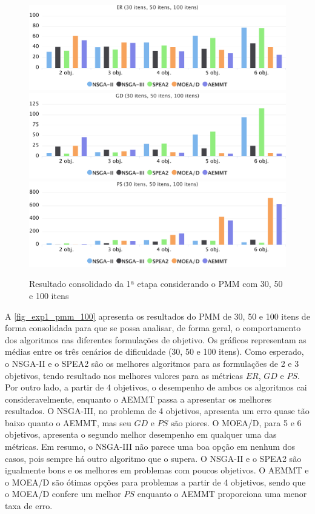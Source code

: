 \begin{figure}[!htbp]
	\includegraphics[width=1\textwidth]{cap_experimentos/figs/etapa1/er-mkp-todos}
	\includegraphics[width=1\textwidth]{cap_experimentos/figs/etapa1/gd-mkp-todos}
	\includegraphics[width=1\textwidth]{cap_experimentos/figs/etapa1/ps-mkp-todos}
	\caption{\label{fig_exp1_pmm_todos}Resultado consolidado da 1ª etapa considerando o PMM com 30, 50 e 100 itens}
\end{figure}

A \autoref{fig_exp1_pmm_100} apresenta os resultados do PMM de 30, 50 e 100 itens de forma consolidada para que se possa analisar, de forma geral, o comportamento dos algoritmos nas diferentes formulações de objetivo. Os gráficos representam as médias entre os três cenários de dificuldade (30, 50 e 100 itens). Como esperado, o NSGA-II e o SPEA2 são os melhores algoritmos para as formulações de 2 e 3 objetivos, tendo resultado nos melhores valores para as métricas $ER$, $GD$ e $PS$. Por outro lado, a partir de 4 objetivos, o desempenho de ambos os algoritmos cai consideravelmente, enquanto o AEMMT passa a apresentar os melhores resultados. O NSGA-III, no problema de 4 objetivos, apresenta um erro quase tão baixo quanto o AEMMT, mas seu $GD$ e $PS$ são piores. O MOEA/D, para 5 e 6 objetivos, apresenta o segundo melhor desempenho em qualquer uma das métricas. Em resumo, o NSGA-III não parece uma boa opção em nenhum dos casos, pois sempre há outro algoritmo que o supera. O NSGA-II e o SPEA2 são igualmente bons e os melhores em problemas com poucos objetivos. O AEMMT e o MOEA/D são ótimas opções para problemas a partir de 4 objetivos, sendo que o MOEA/D confere um melhor $PS$ enquanto o AEMMT proporciona uma menor taxa de erro.

